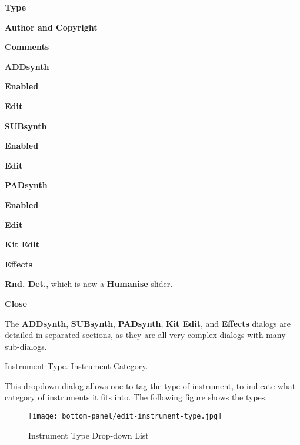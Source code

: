    \begin{enumber}
      \item \textbf{Type}
      \item \textbf{Author and Copyright}
      \item \textbf{Comments}
      \item \textbf{ADDsynth}
      \begin{enumber}
         \item \textbf{Enabled}
         \item \textbf{Edit}
      \end{enumber}
      \item \textbf{SUBsynth}
      \begin{enumber}
         \item \textbf{Enabled}
         \item \textbf{Edit}
      \end{enumber}
      \item \textbf{PADsynth}
      \begin{enumber}
         \item \textbf{Enabled}
         \item \textbf{Edit}
      \end{enumber}
      \item \textbf{Kit Edit}
      \item \textbf{Effects}
      \item \textbf{Rnd. Det.}, which is now a \textbf{Humanise} slider.
      \item \textbf{Close}
   \end{enumber}

   The \textbf{ADDsynth}, \textbf{SUBsynth}, \textbf{PADsynth},
   \textbf{Kit Edit}, and \textbf{Effects}
   dialogs are detailed in separated sections, as they are all
   very complex dialogs with many sub-dialogs.

   \setcounter{ItemCounter}{0}      %

   Instrument Type.
   Instrument Category.

   This dropdown dialog allows one to tag the type of instrument, to
   indicate what category of instruments it fits into.
   The following figure shows the types.

\begin{figure}[H]
   \centering 
   \texttt{[image: bottom-panel/edit-instrument-type.jpg]}
   \caption{Instrument Type Drop-down List}
   \label{fig:instrument_type_dropdown}
\end{figure}

